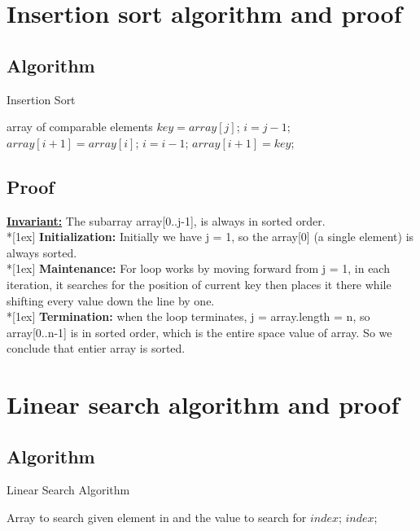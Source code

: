 \documentclass{article}
\begin{document}
\section{Insertion sort algorithm and proof}

\subsection{Algorithm}
\begin{algorithm}
\caption{Insertion Sort}
\begin{algorithmic}[1]
    \Require array of comparable elements
     
            \State $key = array[j]$; 
            \State $i = j - 1$; 
                \State $array[i + 1] = array[i]$;
                \State $i = i - 1$; 
            \EndWhile
            \State $array[i + 1] = key$;
        \EndFor
    \EndFunction
\end{algorithmic}
\end{algorithm}

\subsection{Proof}

\textbf{\underline{Invariant:}} The subarray array[0..j-1], is always in sorted order. 
\\*[1ex]
\textbf{Initialization:} Initially we have j = 1, so the array[0] (a single element) is always sorted.
\\*[1ex]
\textbf{Maintenance:} For loop works by moving forward from j = 1, in each iteration, it searches for the position of current key then places it there while shifting every value down the line by one.
\\*[1ex]
\textbf{Termination:} when the loop terminates, j = array.length = n, so array[0..n-1] is in sorted order, which is the entire space value of array. So we conclude that entier array is sorted.

\pagebreak

\section{Linear search algorithm and proof}

\subsection{Algorithm}
\begin{algorithm}
\caption{Linear Search Algorithm}
\begin{algorithmic}[1]
    \Require Array to search given element in and the value to search for
                \State \Return $index$;
            \EndIf
        \EndFor
        \State \Return $index$;
    \EndFunction
\end{algorithmic}
\end{algorithm}
\end{document}
